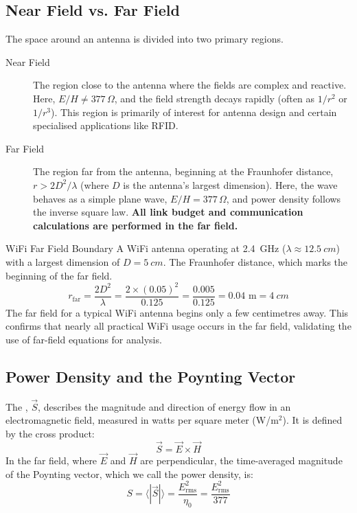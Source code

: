 \subsection{Near Field vs. Far Field}

The space around an antenna is divided into two primary regions.
\begin{description}
    \item[Near Field] The region close to the antenna where the fields are complex and reactive. Here, $E/H \neq 377\,\Omega$, and the field strength decays rapidly (often as $1/r^2$ or $1/r^3$). This region is primarily of interest for antenna design and certain specialised applications like RFID.
    \item[Far Field] The region far from the antenna, beginning at the Fraunhofer distance, $r > 2D^2/\lambda$ (where $D$ is the antenna's largest dimension). Here, the wave behaves as a simple plane wave, $E/H = 377\,\Omega$, and power density follows the inverse square law. \textbf{All link budget and communication calculations are performed in the far field.}
\end{description}

\begin{workedexample}{WiFi Far Field Boundary}
     A WiFi antenna operating at \qty{2.4}{GHz} ($\lambda \approx \qty{12.5}{cm}$) with a largest dimension of $D = \qty{5}{cm}$.
     The Fraunhofer distance, which marks the beginning of the far field.
    \[
        r_{\text{far}} = \frac{2D^2}{\lambda} = \frac{2 \times (0.05)^2}{0.125} = \frac{0.005}{0.125} = 0.04 \text{ m} = \qty{4}{cm}
    \]
     The far field for a typical WiFi antenna begins only a few centimetres away. This confirms that nearly all practical WiFi usage occurs in the far field, validating the use of far-field equations for analysis.
\end{workedexample}

\subsection{Power Density and the Poynting Vector}

The , $\vec{S}$, describes the magnitude and direction of energy flow in an electromagnetic field, measured in watts per square meter (W/m$^2$). It is defined by the cross product:
\begin{equation}
    \vec{S} = \vec{E} \times \vec{H}
\end{equation}
In the far field, where $\vec{E}$ and $\vec{H}$ are perpendicular, the time-averaged magnitude of the Poynting vector, which we call the power density, is:
\begin{equation}
    S = \langle |\vec{S}| \rangle = \frac{E_{\text{rms}}^2}{\eta_0} = \frac{E_{\text{rms}}^2}{377}
\end{equation}


